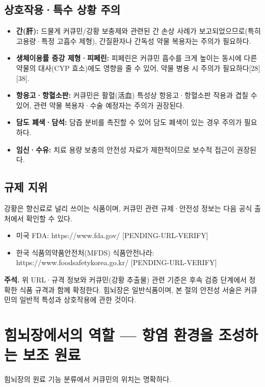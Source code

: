 \documentclass[11pt,oneside]{book}
\newenvironment{authnote}
  {\par\smallskip\begingroup\leftskip=7mm\rightskip=5mm\small\color{muted}\noindent\ignorespaces}
  {\par\endgroup\smallskip}
\begin{document}
\subsection{상호작용·특수 상황 주의}
\begin{itemize}[leftmargin=6mm,itemsep=1pt,topsep=2pt]
  \item \textbf{간(肝):} 드물게 커큐민/강황 보충제와 관련된 간 손상 사례가 보고되었으므로(특히 고용량·특정 고흡수 제형), 간질환자나 간독성 약물 복용자는 주의가 필요하다.
  \item \textbf{생체이용률 증강 제형·피페린:} 피페린은 커큐민 흡수를 크게 높이는 동시에 다른 약물의 대사(CYP 효소)에도 영향을 줄 수 있어, 약물 병용 시 주의가 필요하다[28][38].
  \item \textbf{항응고·항혈소판:} 커큐민은 활혈(活血) 특성상 항응고·항혈소판 작용과 겹칠 수 있어, 관련 약물 복용자·수술 예정자는 주의가 권장된다.
  \item \textbf{담도 폐색·담석:} 담즙 분비를 촉진할 수 있어 담도 폐색이 있는 경우 주의가 필요하다.
  \item \textbf{임신·수유:} 치료 용량 보충의 안전성 자료가 제한적이므로 보수적 접근이 권장된다.
\end{itemize}
\subsection{규제 지위}
강황은 향신료로 널리 쓰이는 식품이며, 커큐민 관련 규제·안전성 정보는 다음 공식 출처에서 확인할 수 있다.

\begin{itemize}[leftmargin=6mm,itemsep=1pt,topsep=2pt]
  \item 미국 FDA: https://www.fda.gov/ [PENDING-URL-VERIFY]
  \item 한국 식품의약품안전처(MFDS) 식품안전나라: https://www.foodsafetykorea.go.kr/ [PENDING-URL-VERIFY]
\end{itemize}
\begin{authnote}\textbf{주석.} 위 URL·규격 정보와 커큐민(강황 추출물) 관련 기준은 후속 검증 단계에서 정확한 식품 규격과 함께 확정한다. 힘뇌장은 일반식품이며, 본 절의 안전성 서술은 커큐민의 일반적 특성과 상호작용에 관한 것이다.\end{authnote}
\section{힘뇌장에서의 역할 — 항염 환경을 조성하는 보조 원료}
힘뇌장의 원료 기능 분류에서 커큐민의 위치는 명확하다.
\end{document}
